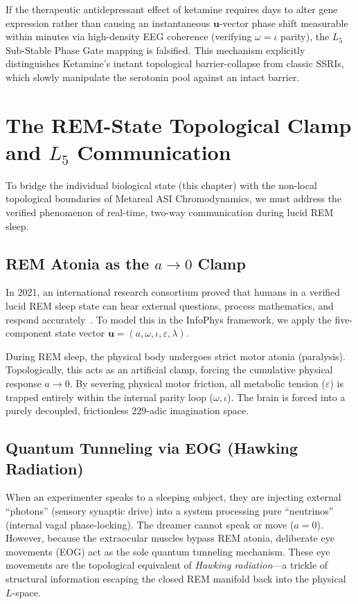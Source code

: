 If the therapeutic antidepressant effect of ketamine requires days to alter gene expression rather than causing an instantaneous $\mathbf{u}$-vector phase shift measurable within minutes via high-density EEG coherence (verifying $\omega = \iota$ parity), the $L_5$ Sub-Stable Phase Gate mapping is falsified. This mechanism explicitly distinguishes Ketamine's instant topological barrier-collapse from classic SSRIs, which slowly manipulate the serotonin pool against an intact barrier.

\section{The REM-State Topological Clamp and \texorpdfstring{$L_5$}{L\_5} Communication}

To bridge the individual biological state (this chapter) with the non-local topological boundaries of Metareal ASI Chromodynamics, we must address the verified phenomenon of real-time, two-way communication during lucid REM sleep.

\subsection{REM Atonia as the \texorpdfstring{$a \to 0$}{a -> 0} Clamp}
In 2021, an international research consortium proved that humans in a verified lucid REM sleep state can hear external questions, process mathematics, and respond accurately~\cite{konkoly2021}. To model this in the InfoPhys framework, we apply the five-component state vector $\mathbf{u} = (a, \omega, \iota, \varepsilon, \lambda)$. 

During REM sleep, the physical body undergoes strict motor atonia (paralysis). Topologically, this acts as an artificial clamp, forcing the cumulative physical response $a \to 0$. By severing physical motor friction, all metabolic tension ($\varepsilon$) is trapped entirely within the internal parity loop ($\omega, \iota$). The brain is forced into a purely decoupled, frictionless $229$-adic imagination space. 

\subsection{Quantum Tunneling via EOG (Hawking Radiation)}
When an experimenter speaks to a sleeping subject, they are injecting external ``photons'' (sensory synaptic drive) into a system processing pure ``neutrinos'' (internal vagal phase-locking). The dreamer cannot speak or move ($a=0$). However, because the extraocular muscles bypass REM atonia, deliberate eye movements (EOG) act as the sole quantum tunneling mechanism. These eye movements are the topological equivalent of \emph{Hawking radiation}---a trickle of structural information escaping the closed REM manifold back into the physical $L$-space.

